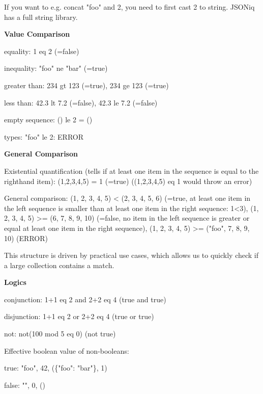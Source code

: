 \documentclass[11pt,oneside,a4paper]{article}
\begin{document}
{If you want to e.g. concat "foo" and 2, you need to first cast 2 to string. JSONiq has a full string library.

\textbf{Value Comparison}
\begin{compactitem}
\item equality: 1 eq 2 (=false)
\item inequality: "foo" ne "bar" (=true)
\item greater than: 234 gt 123 (=true), 234 ge 123 (=true)
\item less than: 42.3 lt 7.2 (=false), 42.3 le 7.2 (=false)
\item empty sequence: () le 2 = ()
\item types: "foo" le 2: ERROR
\end{compactitem}

\textbf{General Comparison}
\begin{compactitem}
\item Existential quantification (tells if at least one item in the sequence is equal to the righthand item): (1,2,3,4,5) = 1 (=true) ((1,2,3,4,5) eq 1 would throw an error)
\item General comparison: (1, 2, 3, 4, 5) < (2, 3, 4, 5, 6) (=true, at least one item in the left sequence is smaller than at least one item in the right sequence: 1<3), (1, 2, 3, 4, 5) >= (6, 7, 8, 9, 10) (=false, no item in the left sequence is greater or equal at least one item in the right sequence), (1, 2, 3, 4, 5) >= ("foo", 7, 8, 9, 10) (ERROR)
\end{compactitem}

This structure is driven by practical use cases, which allows us to quickly check if a large collection contains a match.

\textbf{Logics}
\begin{compactitem}
\item conjunction: 1+1 eq 2 and 2+2 eq 4 (true and true)
\item disjunction: 1+1 eq 2 or 2+2 eq 4 (true or true)
\item not: not(100 mod 5 eq 0) (not true)
\item Effective boolean value of non-booleans:
\begin{compactitem}
	\item true: "foo", 42, (\{"foo": "bar"\}, 1)
	\item false: "", 0, ()\\
\end{compactitem}
\end{compactitem}

}
\end{document}
